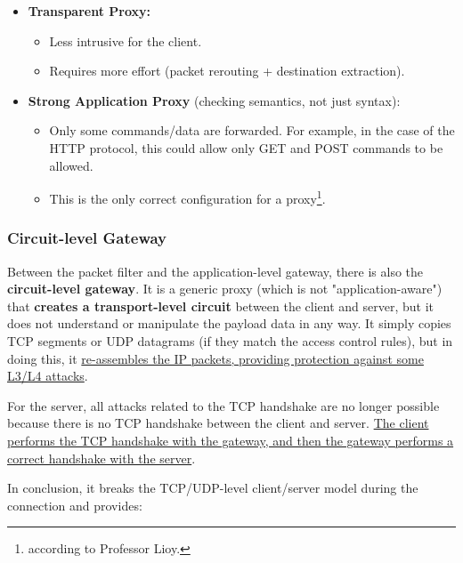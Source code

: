 \begin{itemize}
	\item \textbf{Transparent Proxy:}
	      \begin{itemize}
		      \item Less intrusive for the client.
		      \item Requires more effort (packet rerouting + destination extraction).
	      \end{itemize}

	\item \textbf{Strong Application Proxy} (checking semantics, not just syntax):
	      \begin{itemize}
		      \item Only some commands/data are forwarded. For example, in the case of the HTTP protocol, this could allow only GET and POST commands to be allowed.
		      \item This is the only correct configuration for a proxy\footnote{according to Professor Lioy.}.
	      \end{itemize}
\end{itemize}



\subsubsection{Circuit-level Gateway}

Between the packet filter and the application-level gateway, there is also the \textbf{circuit-level gateway}. It is a generic proxy (which is not "application-aware") that \textbf{creates a transport-level circuit} between the client and server, but it does not understand or manipulate the payload data in any way. It simply copies TCP segments or UDP datagrams (if they match the access control rules), but in doing this, it \ul{re-assembles the IP packets, providing protection against some L3/L4 attacks}.

For the server, all attacks related to the TCP handshake are no longer possible because there is no TCP handshake between the client and server. \ul{The client performs the TCP handshake with the gateway, and then the gateway performs a correct handshake with the server}.

In conclusion, it breaks the TCP/UDP-level client/server model during the connection and provides:

